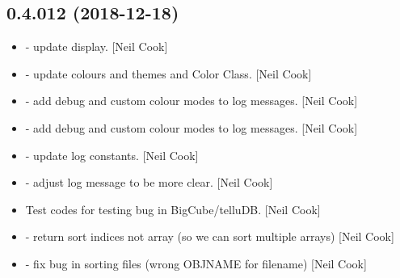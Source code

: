 \documentclass[a4paper,10pt,english]{report}
\begin{document}
\subsection{0.4.012 (2018-12-18)}
\label{\detokenize{misc/changelog:id227}}\begin{itemize}
\item {} 
 - update display. {[}Neil Cook{]}

\item {} 
 - update colours and themes and Color Class. {[}Neil
Cook{]}

\item {} 
 - add debug and custom colour modes to log messages.
{[}Neil Cook{]}

\item {} 
 - add debug and custom colour modes to log messages.
{[}Neil Cook{]}

\item {} 
 - update log constants. {[}Neil Cook{]}

\item {} 
 - adjust log message to be more clear. {[}Neil
Cook{]}

\item {} 
Test codes for testing bug in BigCube/telluDB. {[}Neil Cook{]}

\item {} 
 - return sort indices not array (so we can
sort multiple arrays) {[}Neil Cook{]}

\item {} 
 - fix bug in sorting files (wrong OBJNAME for
filename) {[}Neil Cook{]}

\end{itemize}
\end{document}
